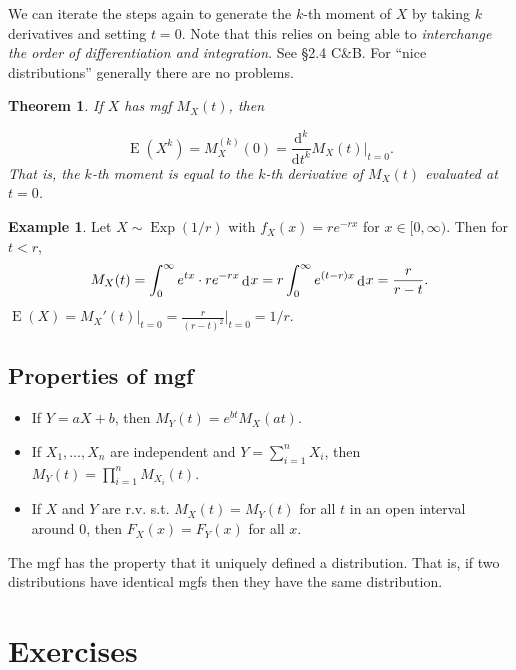 \documentclass[
]{book}
\providecommand{\tightlist}{%
  \setlength{\itemsep}{0pt}\setlength{\parskip}{0pt}}
\DeclareMathOperator{\E}{E}
\DeclareMathOperator{\Exp}{Exp}
\DeclareMathOperator{\dd}{d}
\newcommand{\dint}{\dd\hspace{0.5pt}\!}
\newcommand{\ddif}{\text{d}}
\newtheorem{theorem}{Theorem}[chapter]
\theoremstyle{definition}
\theoremstyle{definition}
\newtheorem{example}{Example}[chapter]
\theoremstyle{definition}
\theoremstyle{definition}
\theoremstyle{remark}
\begin{document}
We can iterate the steps again to generate the \(k\)-th moment of \(X\) by taking \(k\) derivatives and setting \(t=0\). Note that this relies on being able to \emph{interchange the order of differentiation and integration}. See §2.4 C\&B. For ``nice distributions'' generally there are no problems.

\begin{theorem}
If \(X\) has mgf \(M_X(t)\), then

\[
\E(X^k) = M_X^{(k)}(0) = \frac{\ddif^k}{\ddif t^k}M_X(t) \bigg|_{t=0}.
\]
That is, the \(k\)-th moment is equal to the \(k\)-th derivative of \(M_X(t)\) evaluated at \(t=0\).
\end{theorem}

\begin{example}
Let \(X\sim\Exp(1/r)\) with \(f_X(x)=r e^{-r x}\) for \(x\in[0,\infty)\). Then for \(t<r\),
\[
M_X(t) = \int_0^\infty e^{tx}\cdot r e^{- r x} \dint x = r \int_0^\infty e^{(t- r)x} \dint x = \frac{ r}{ r-  t}.
\]
\(\E(X)=M_X'(t)\big|_{t=0}=\frac{r}{(r-t)^2}\Big|_{t=0}=1/r\).
\end{example}

\hypertarget{properties-of-mgf}{%
\subsection{Properties of mgf}\label{properties-of-mgf}}

\begin{itemize}
\tightlist
\item
  If \(Y=aX+b\), then \(M_Y(t)=e^{bt}M_X(at)\).
\item
  If \(X_1,\dots,X_n\) are independent and \(Y=\sum_{i=1}^n X_i\), then \(M_Y(t)=\prod_{i=1}^n M_{X_i}(t)\).
\item
  If \(X\) and \(Y\) are r.v. s.t. \(M_X(t)=M_Y(t)\) for all \(t\) in an open interval around 0, then \(F_X(x)=F_Y(x)\) for all \(x\).
\end{itemize}

The mgf has the property that it uniquely defined a distribution.
That is, if two distributions have identical mgfs then they have the same distribution.

\hypertarget{exercises}{%
\section{Exercises}\label{exercises}}
\end{document}
